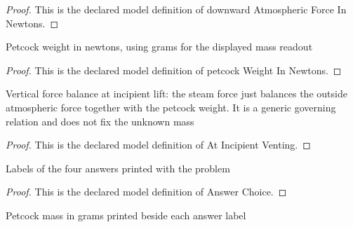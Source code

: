 \begin{proof}
  This is the declared model definition of downward Atmospheric Force In Newtons.
\end{proof}
\begin{definition}
  \label{def:physics:phyx-mini-0398:phyxminiproblems-problemphyxmini0398-petcockweightinnewtons}
  Petcock weight in newtons, using grams for the displayed mass readout
\end{definition}
\begin{proof}
  This is the declared model definition of petcock Weight In Newtons.
\end{proof}
\begin{definition}
  \label{def:physics:phyx-mini-0398:phyxminiproblems-problemphyxmini0398-atincipientventing}
  Vertical force balance at incipient lift: the steam force just balances the outside atmospheric force together with the petcock weight. It is a generic governing relation and does not fix the unknown mass
\end{definition}
\begin{proof}
  This is the declared model definition of At Incipient Venting.
\end{proof}
\begin{definition}
  \label{def:physics:phyx-mini-0398:phyxminiproblems-problemphyxmini0398-answerchoice}
  Labels of the four answers printed with the problem
\end{definition}
\begin{proof}
  This is the declared model definition of Answer Choice.
\end{proof}
\begin{definition}
  \label{def:physics:phyx-mini-0398:phyxminiproblems-problemphyxmini0398-displayedmassingrams}
  Petcock mass in grams printed beside each answer label
\end{definition}
